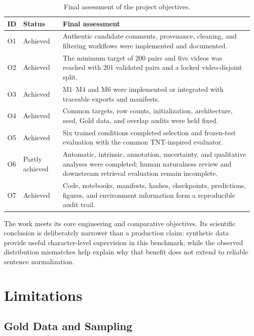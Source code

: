 \documentclass[12pt, a4paper, twoside, openany]{report}
\begin{document}
\begin{table}[H]
	\centering
	\caption{Final assessment of the project objectives.}
	\label{tab:objective-assessment}
	\small
	\begin{tabularx}{\textwidth}{p{0.8cm}p{2.3cm}X}
		\toprule
		\textbf{ID} & \textbf{Status} & \textbf{Final assessment} \\
		\midrule
		O1 & Achieved & Authentic candidate comments, provenance, cleaning, and filtering workflows were implemented and documented. \\
		O2 & Achieved & The minimum target of 200 pairs and five videos was reached with 201 validated pairs and a locked video-disjoint split. \\
		O3 & Achieved & M1--M4 and M6 were implemented or integrated with traceable exports and manifests. \\
		O4 & Achieved & Common targets, row counts, initialization, architecture, seed, Gold data, and overlap audits were held fixed. \\
		O5 & Achieved & Six trained conditions completed selection and frozen-test evaluation with the common TNT-inspired evaluator. \\
		O6 & Partly achieved & Automatic, intrinsic, annotation, uncertainty, and qualitative analyses were completed; human naturalness review and downstream retrieval evaluation remain incomplete. \\
		O7 & Achieved & Code, notebooks, manifests, hashes, checkpoints, predictions, figures, and environment information form a reproducible audit trail. \\
		\bottomrule
	\end{tabularx}
\end{table}

The work meets its core engineering and comparative objectives. Its scientific conclusion is deliberately narrower than a production claim: synthetic data provide useful character-level supervision in this benchmark, while the observed distribution mismatches help explain why that benefit does not extend to reliable sentence normalization.


\section{Limitations}

\subsection{Gold Data and Sampling}
\end{document}
